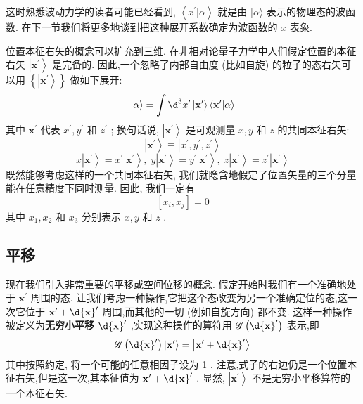 \documentclass[lang=cn,newtx,10pt,scheme=chinese,thmcnt=section]{elegantbook}
\begin{document}
这时熟悉波动力学的读者可能已经看到, $\left\langle {{x}^{\prime } | \alpha }\right\rangle$ 就是由 $|\alpha \rangle$ 表示的物理态的波函数. 在下一节我们将更多地谈到把这种展开系数确定为波函数的 $x$ 表象.

位置本征右矢的概念可以扩充到三维. 在非相对论量子力学中人们假定位置的本征右矢 $\left| {\mathbf{x}}^{\prime }\right\rangle$ 是完备的. 因此,一个忽略了内部自由度 (比如自旋) 的粒子的态右矢可以用 $\left\{ \left| {\mathbf{x}}^{\prime }\right\rangle \right\}$ 做如下展开:
\begin{equation}
	|\alpha \rangle = \int {\d}^{3}{x}^{\prime }\left| {\mathbf{x}}^{\prime }\right\rangle \left\langle {{\mathbf{x}}^{\prime } | \alpha }\right\rangle
\end{equation}
其中 ${\mathbf{x}}^{\prime }$ 代表 ${x}^{\prime },{y}^{\prime }$ 和 ${z}^{\prime }$ ; 换句话说, $\left| {\mathbf{x}}^{\prime }\right\rangle$ 是可观测量 $x, y$ 和 $z$ 的共同本征右矢:
\begin{equation}
	\left| {\mathbf{x}}^{\prime }\right\rangle \equiv \left| {{x}^{\prime },{y}^{\prime },{z}^{\prime }}\right\rangle
\end{equation}
\begin{equation}
	x\left| {\mathbf{x}}^{\prime }\right\rangle = {x}^{\prime }\left| {\mathbf{x}}^{\prime }\right\rangle ,\;y\left| {\mathbf{x}}^{\prime }\right\rangle = {y}^{\prime }\left| {\mathbf{x}}^{\prime }\right\rangle ,\;z\left| {\mathbf{x}}^{\prime }\right\rangle = {z}^{\prime }\left| {\mathbf{x}}^{\prime }\right\rangle
\end{equation}
既然能够考虑这样的一个共同本征右矢, 我们就隐含地假定了位置矢量的三个分量能在任意精度下同时测量. 因此, 我们一定有
\begin{equation}
	\left\lbrack {{x}_{i},{x}_{j}}\right\rbrack = 0
\end{equation}
其中 ${x}_{1},{x}_{2}$ 和 ${x}_{3}$ 分别表示 $x, y$ 和 $z$ .
\subsection*{平移}
现在我们引入非常重要的平移或空间位移的概念. 假定开始时我们有一个准确地处于 ${\mathbf{x}}^{\prime }$ 周围的态. 让我们考虑一种操作,它把这个态改变为另一个准确定位的态,这一次它位于 ${\mathbf{x}}^{\prime } + \d{\mathbf{x}}^{\prime }$ 周围,而其他的一切 (例如自旋方向) 都不变. 这样一种操作被定义为\textbf{无穷小平移} $\d{\mathbf{x}}^{\prime }$ ,实现这种操作的算符用 $\mathscr{G}\left( {\d{\mathbf{x}}^{\prime }}\right)$ 表示,即
\begin{equation}
	\mathscr{G}\left( {\d{\mathbf{x}}^{\prime }}\right) \left| {\mathbf{x}}^{\prime }\right\rangle = \left| {{\mathbf{x}}^{\prime } + \d{\mathbf{x}}^{\prime }}\right\rangle
\end{equation}
其中按照约定, 将一个可能的任意相因子设为 1 . 注意,式子的右边仍是一个位置本征右矢,但是这一次,其本征值为 ${\mathbf{x}}^{\prime } + \d{\mathbf{x}}^{\prime }$ . 显然, $\left| {\mathbf{x}}^{\prime }\right\rangle$ 不是无穷小平移算符的一个本征右矢.
\end{document}

